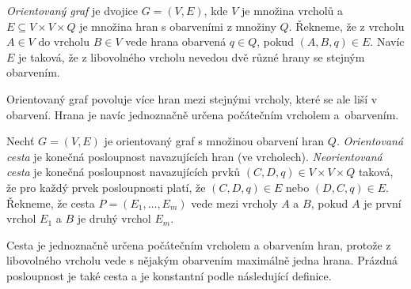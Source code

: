 \begin{definice}
    \emph{Orientovaný graf} je dvojice $G = (V,E)$, kde $V$ je množina vrcholů a $E \subseteq V\times V \times Q$ je množina hran s obarveními z množiny $Q$. 
    Řekneme, že z vrcholu $A \in V$ do vrcholu $B \in V$ vede hrana obarvená $q \in Q$, pokud $(A,B,q) \in E$. Navíc $E$ je taková, že z libovolného vrcholu nevedou dvě různé hrany se stejným obarvením.
\end{definice}
\begin{pozn}
    Orientovaný graf povoluje více hran mezi stejnými vrcholy, které se ale liší v obarvení. Hrana je navíc jednoznačně určena počátečním vrcholem a~obarvením.
\end{pozn}
\begin{definice}
    Nechť $G = (V, E)$ je orientovaný graf s množinou obarvení hran $Q$.
    \emph{Orientovaná cesta} je konečná posloupnost navazujících hran (ve vrcholech).
    \emph{Neorientovaná cesta} je konečná posloupnost navazujících prvků $(C,D,q) \in V \times V \times Q$ taková, že pro každý prvek posloupnosti platí, že $(C,D,q) \in E$ nebo $(D,C,q) \in E$. Řekneme, že cesta $P = (E_1, \dots, E_m)$ vede mezi vrcholy $A$ a $B$, pokud $A$ je první vrchol $E_1$ a $B$ je druhý vrchol $E_m$. 
\end{definice}
\begin{pozn}
    Cesta je jednoznačně určena počátečním vrcholem a obarvením hran, protože z libovolného vrcholu vede s nějakým obarvením maximálně jedna hrana.
    Prázdná posloupnost je také cesta a je konstantní podle následující definice. 
\end{pozn}

